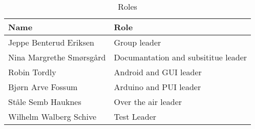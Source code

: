 \begin{table}
\begin{tabular}{|l|l|}
\hline
	{\bf Name} & {\bf Role}\\
\hline
	Jeppe Benterud Eriksen & Group leader\\
\hline
	Nina Margrethe Smørsgård & Documantation and subsititue leader\\
\hline
	Robin Tordly & Android and GUI leader\\
\hline
	Bjørn Arve Fossum & Arduino and PUI leader\\
\hline
	Ståle Semb Hauknes & Over the air leader\\
\hline
	Wilhelm Walberg Schive & Test Leader\\
\hline
\end{tabular}
\caption{Roles}
\end{table}